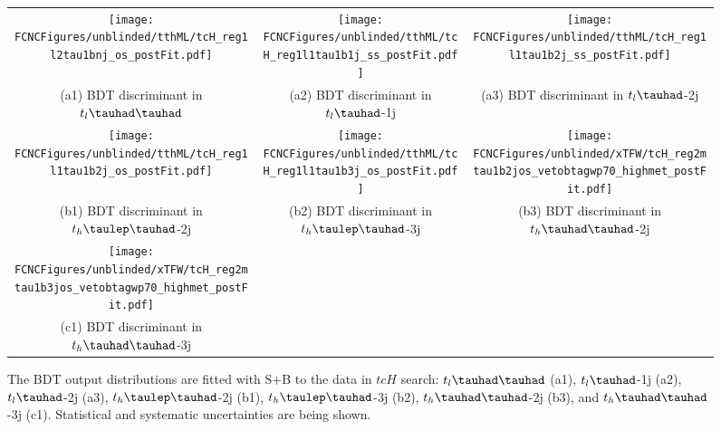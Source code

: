 \begin{figure}[H]
\begin{tabular}{@{}ccc@{}}
\texttt{[image: \\FCNCFigures/unblinded/tthML/tcH\_reg1l2tau1bnj\_os\_postFit.pdf]}&
\texttt{[image: \\FCNCFigures/unblinded/tthML/tcH\_reg1l1tau1b1j\_ss\_postFit.pdf]}&
\texttt{[image: \\FCNCFigures/unblinded/tthML/tcH\_reg1l1tau1b2j\_ss\_postFit.pdf]}\\
(a1) BDT discriminant in $t_l\thadhad$ & (a2) BDT discriminant in  $t_l\tauhad$-1j& (a3) BDT discriminant in $t_l\tauhad$-2j\\
\texttt{[image: \\FCNCFigures/unblinded/tthML/tcH\_reg1l1tau1b2j\_os\_postFit.pdf]}&
\texttt{[image: \\FCNCFigures/unblinded/tthML/tcH\_reg1l1tau1b3j\_os\_postFit.pdf]}&
\texttt{[image: \\FCNCFigures/unblinded/xTFW/tcH\_reg2mtau1b2jos\_vetobtagwp70\_highmet\_postFit.pdf]}\\
(b1) BDT discriminant in $t_h\tlhad$-2j & (b2) BDT discriminant in  $t_h\tlhad$-3j & (b3) BDT discriminant in $t_h\thadhad$-2j \\
\texttt{[image: \\FCNCFigures/unblinded/xTFW/tcH\_reg2mtau1b3jos\_vetobtagwp70\_highmet\_postFit.pdf]}& \\
(c1) BDT discriminant in$t_h\thadhad$-3j\\
\end{tabular}
\caption{ The BDT output distributions are fitted with S+B to the data in $tcH$ search: $t_l\thadhad$ (a1),  $t_l\tauhad$-1j (a2),  $t_l\tauhad$-2j (a3),
  $t_h\tlhad$-2j (b1), $t_h\tlhad$-3j (b2), $t_h\thadhad$-2j (b3), and $t_h\thadhad$-3j (c1). Statistical and systematic uncertainties are being shown.}
\label{fig:asimov_postfitbdtHc}
\end{figure}

